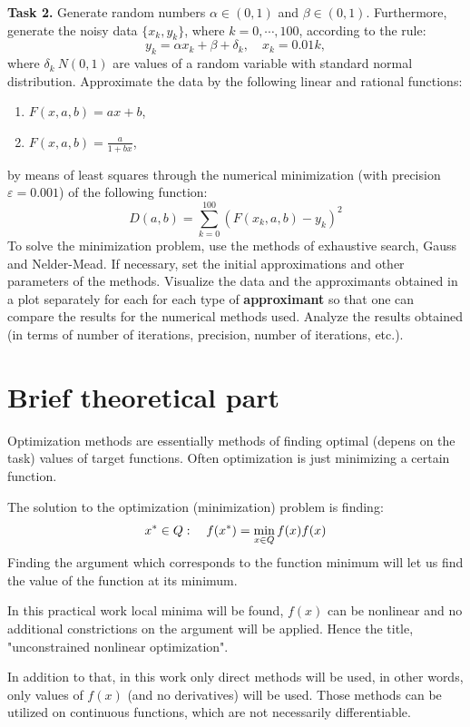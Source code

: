 \documentclass[12pt, a4paper]{article}
\begin{document}
\textbf{Task 2.} Generate random numbers $\alpha \in (0, 1)$ and $\beta \in (0, 1)$. Furthermore, generate the noisy data $\{ x_k, y_k \}$, where $k = 0, \cdots, 100$, according to the rule:
\[ y_k = \alpha x_k + \beta + \delta_k, \quad x_k = 0.01 k, \]
where $\delta_k ~ N(0, 1)$ are values of a random variable with standard normal distribution. Approximate the data by the following linear and rational functions:
\begin{enumerate}
	\item $F(x, a, b) = ax + b$,
	\item $F(x, a, b) = \frac{a}{1+bx}$,
\end{enumerate}
by means of least squares through the numerical minimization (with precision $\varepsilon = 0.001$) of the following function:
\[ D(a, b) = \sum_{k=0}^{100} \left( F(x_k, a, b) - y_k \right)^2 \]
To solve the minimization problem, use the methods of exhaustive search, Gauss and Nelder-Mead. If necessary, set the initial approximations and other parameters of the methods. Visualize the data and the approximants obtained in a plot separately for each for each type of \textbf{approximant} so that one can compare the results for the numerical methods used. Analyze the results obtained (in terms of number of iterations, precision, number of iterations, etc.).

\newpage

\section*{Brief theoretical part}

Optimization methods are essentially methods of finding optimal (depens on the task) values of target functions. Often optimization is just minimizing a certain function.

The solution to the optimization (minimization) problem is finding:
\[ x^* \in Q: \quad f(x^*) = \min_{x\in Q} f(x) \def \arg \min_{x\in Q} f(x) \]
Finding the argument which corresponds to the function minimum will let us find the value of the function at its minimum.

In this practical work local minima will be found, $f(x)$ can be nonlinear and no additional constrictions on the argument will be applied. Hence the title, "unconstrained nonlinear optimization".

In addition to that, in this work only direct methods will be used, in other words, only values of $f(x)$ (and no derivatives) will be used. Those methods can be utilized on continuous functions, which are not necessarily differentiable.
\end{document}
